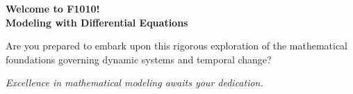 \documentclass[10pt,aspectratio=169]{beamer}
\newcommand{\concept}[1]{\textbf{#1}}
\newcommand{\emphasis}[1]{\textit{#1}}
\begin{document}
\begin{frame}[standout]
    \concept{Welcome to F1010!}\\
    \textbf{Modeling with Differential Equations}
    
    \vspace{1cm}
    
    \Large Are you prepared to embark upon this rigorous exploration of the mathematical foundations governing dynamic systems and temporal change?
    
    \vspace{0.5cm}
    
    \emphasis{Excellence in mathematical modeling awaits your dedication.}
\end{frame}
\end{document}

